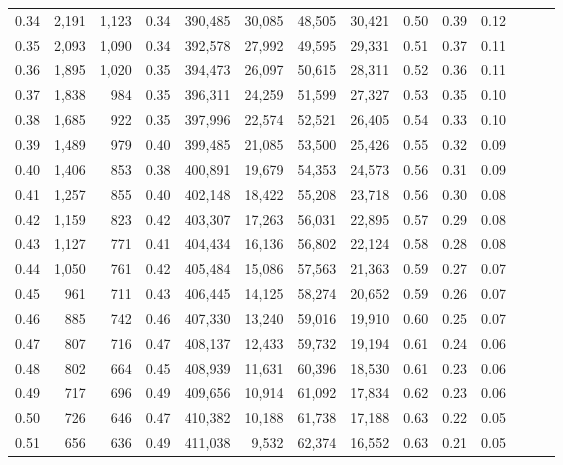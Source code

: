 \begin{tabular}{rrrrrrrrrrrrrr}
0.34 &   2,191 &  1,123 &  0.34 &  390,485 &   30,085 &  48,505 &  30,421 &  0.50 &  0.39 &      0.12 \\
0.35 &   2,093 &  1,090 &  0.34 &  392,578 &   27,992 &  49,595 &  29,331 &  0.51 &  0.37 &      0.11 \\
0.36 &   1,895 &  1,020 &  0.35 &  394,473 &   26,097 &  50,615 &  28,311 &  0.52 &  0.36 &      0.11 \\
0.37 &   1,838 &    984 &  0.35 &  396,311 &   24,259 &  51,599 &  27,327 &  0.53 &  0.35 &      0.10 \\
0.38 &   1,685 &    922 &  0.35 &  397,996 &   22,574 &  52,521 &  26,405 &  0.54 &  0.33 &      0.10 \\
0.39 &   1,489 &    979 &  0.40 &  399,485 &   21,085 &  53,500 &  25,426 &  0.55 &  0.32 &      0.09 \\
0.40 &   1,406 &    853 &  0.38 &  400,891 &   19,679 &  54,353 &  24,573 &  0.56 &  0.31 &      0.09 \\
0.41 &   1,257 &    855 &  0.40 &  402,148 &   18,422 &  55,208 &  23,718 &  0.56 &  0.30 &      0.08 \\
0.42 &   1,159 &    823 &  0.42 &  403,307 &   17,263 &  56,031 &  22,895 &  0.57 &  0.29 &      0.08 \\
0.43 &   1,127 &    771 &  0.41 &  404,434 &   16,136 &  56,802 &  22,124 &  0.58 &  0.28 &      0.08 \\
0.44 &   1,050 &    761 &  0.42 &  405,484 &   15,086 &  57,563 &  21,363 &  0.59 &  0.27 &      0.07 \\
0.45 &     961 &    711 &  0.43 &  406,445 &   14,125 &  58,274 &  20,652 &  0.59 &  0.26 &      0.07 \\
0.46 &     885 &    742 &  0.46 &  407,330 &   13,240 &  59,016 &  19,910 &  0.60 &  0.25 &      0.07 \\
0.47 &     807 &    716 &  0.47 &  408,137 &   12,433 &  59,732 &  19,194 &  0.61 &  0.24 &      0.06 \\
0.48 &     802 &    664 &  0.45 &  408,939 &   11,631 &  60,396 &  18,530 &  0.61 &  0.23 &      0.06 \\
0.49 &     717 &    696 &  0.49 &  409,656 &   10,914 &  61,092 &  17,834 &  0.62 &  0.23 &      0.06 \\
0.50 &     726 &    646 &  0.47 &  410,382 &   10,188 &  61,738 &  17,188 &  0.63 &  0.22 &      0.05 \\
0.51 &     656 &    636 &  0.49 &  411,038 &    9,532 &  62,374 &  16,552 &  0.63 &  0.21 &      0.05 \\

\end{tabular}
